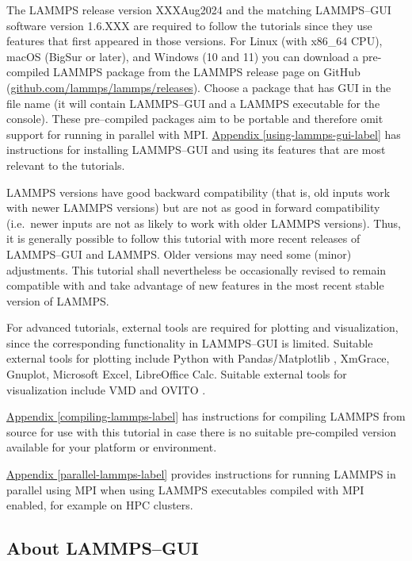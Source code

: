 \documentclass[9pt,tutorial]{livecoms}
\begin{document}
The LAMMPS release version XXXAug2024 \cite{lammps_code} and the
matching LAMMPS--GUI software version 1.6.XXX are required to follow the
tutorials since they use features that first appeared in those versions.
For Linux (with x86\_64 CPU), macOS (BigSur or later), and Windows (10
and 11) you can download a pre-compiled LAMMPS package from the LAMMPS
release page on GitHub
(\href{https://github.com/lammps/lammps/releases}{github.com/lammps/lammps/releases}).
Choose a package that has GUI in the file name (it will contain
LAMMPS--GUI and a LAMMPS executable for the console).  These
pre--compiled packages aim to be portable and therefore omit support for
running in parallel with MPI. \hyperref[using-lammps-gui]{Appendix
  \ref{using-lammps-gui-label}} has instructions for installing
LAMMPS--GUI and using its features that are most relevant to the
tutorials.

LAMMPS versions have good backward compatibility (that is, old inputs
work with newer LAMMPS versions) but are not as good in forward
compatibility (i.e.~newer inputs are not as likely to work with older
LAMMPS versions).  Thus, it is generally possible to follow this
tutorial with more recent releases of LAMMPS--GUI and LAMMPS.  Older
versions may need some (minor) adjustments.  This tutorial shall
nevertheless be occasionally revised to remain compatible with and take
advantage of new features in the most recent stable version of LAMMPS.

For advanced tutorials, external tools are required for plotting and
visualization, since the corresponding functionality in LAMMPS--GUI is
limited.  Suitable external tools for plotting include Python with
Pandas/Matplotlib \cite{van1995python,hunter2007Matplotlib}, XmGrace,
Gnuplot, Microsoft Excel, LibreOffice Calc.  Suitable external tools for
visualization include VMD \cite{vmd_home,humphrey1996vmd} and OVITO
\cite{ovito_home,ovito_paper}.

\hyperref[compiling-lammps-label]{Appendix \ref{compiling-lammps-label}}
has instructions for compiling LAMMPS from source for use with this
tutorial in case there is no suitable pre-compiled version available
for your platform or environment.

\hyperref[parallel-lammps-label]{Appendix \ref{parallel-lammps-label}}
provides instructions for running LAMMPS in parallel using MPI when
using LAMMPS executables compiled with MPI enabled, for example on HPC
clusters.

\subsection{About LAMMPS--GUI}
\end{document}

